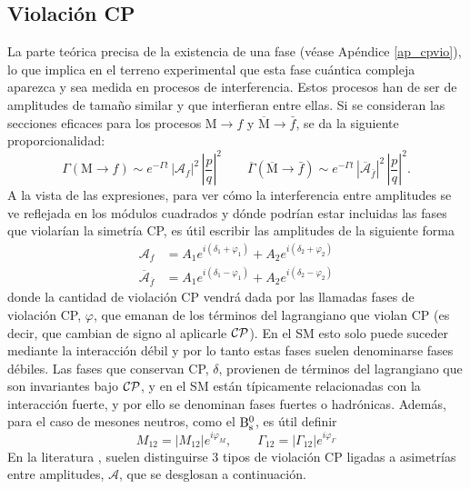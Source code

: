 \subsection{Violación CP} %


\color{vero} La parte teórica \color{norm}  precisa de la existencia de una fase (véase Apéndice \ref{ap_cpvio}), lo que implica en el terreno experimental que esta fase cuántica compleja aparezca y sea medida en procesos de interferencia. Estos procesos han de ser de amplitudes de tamaño similar y que interfieran entre ellas. Si se consideran las secciones eficaces para los procesos $\text{M} \rightarrow f $ y $\overline{\text{M}} \rightarrow \bar f $, se da la siguiente proporcionalidad:
\[\Gamma (\text{M} \rightarrow f )  \sim e^{-\Gamma t} \, |\mathcal{A}_f|^2 \, \left| \frac{p}{q} \right|^2 \qquad	
\overline{\Gamma} (\overline{\text{M}} \rightarrow \bar f )  \sim e^{-\Gamma t} \,  |\overline{\mathcal{A}}_{\bar f}|^2 \, \left| \frac{p}{q} \right|^2.\]
A la vista de las expresiones, para ver cómo la interferencia entre amplitudes se ve reflejada en los módulos cuadrados y dónde podrían estar incluidas las fases que violarían la simetría CP, es útil escribir las amplitudes de la siguiente forma \color{vero}
\begin{equation}
\begin{split}
\mathcal{A}_f & = A_1 e^{i(\delta_1+\varphi_1)}	 + A_2 e^{i(\delta_2+\varphi_2)}	\\
\overline{\mathcal{A}}_{\overline{f}} & = A_1e^{i(\delta_1-\varphi_1)}	 + A_2e^{i(\delta_2-\varphi_2)}	
\end{split}
\end{equation} \color{norm}
donde la cantidad de violación CP vendrá dada por las llamadas fases de violación CP, $\varphi$, que emanan de los términos del lagrangiano que violan CP (es decir, que cambian de signo al aplicarle $\mathcal{CP}$). En el SM esto solo puede suceder mediante la interacción débil  y por lo tanto estas fases suelen denominarse fases débiles.  Las fases que conservan CP, $\delta$, provienen de términos del lagrangiano que son invariantes bajo $\mathcal{CP}$, y en el SM están típicamente relacionadas con la interacción fuerte, y por ello se denominan fases fuertes o hadrónicas.
Además, para el caso de mesones neutros, como el $\mathrm{B}{}_{\mathrm{s}}^{0}$, es útil definir
\begin{equation}
	M_{12} = |M_{12}|e^{i\varphi_M}, \qquad \Gamma_{12} = |\Gamma_{12}|e^{i\varphi_{\Gamma}}
\end{equation}
%
En la literatura \cite{lavoura}, suelen distinguirse 3 tipos de violación CP ligadas a asimetrías entre amplitudes, $\mathscr{A}$, que se desglosan a continuación.




